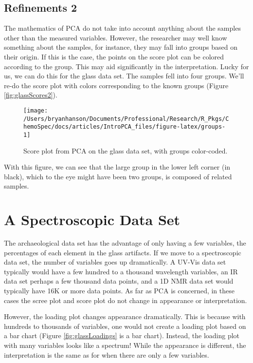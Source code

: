 \documentclass[10pt,twocolumn,twoside,]{pinp}
\begin{document}
\hypertarget{refinements-2}{%
\subsection{Refinements 2}\label{refinements-2}}

The mathematics of PCA do not take into account anything about the
samples other than the measured variables. However, the researcher may
well know something about the samples, for instance, they may fall into
groups based on their origin. If this is the case, the points on the
score plot can be colored according to the group. This may aid
significantly in the interpretation. Lucky for us, we can do this for
the glass data set. The samples fell into four groups. We'll re-do the
score plot with colors corresponding to the known groups (Figure
\ref{fig:glassScores2}).

\begin{figure}

{\centering \texttt{[image: /Users/bryanhanson/Documents/Professional/Research/R\_Pkgs/ChemoSpec/docs/articles/IntroPCA\_files/figure-latex/groups-1]} 

}

\caption{Score plot from PCA on the glass data set, with groups color-coded.\label{fig:glassScores2}}\label{fig:groups}
\end{figure}

With this figure, we can see that the large group in the lower left
corner (in black), which to the eye might have been two groups, is
composed of related samples.

\hypertarget{a-spectroscopic-data-set}{%
\section{A Spectroscopic Data Set}\label{a-spectroscopic-data-set}}

The archaeological data set has the advantage of only having a few
variables, the percentages of each element in the glass artifacts. If we
move to a spectroscopic data set, the number of variables goes up
dramatically. A UV-Vis data set typically would have a few hundred to a
thousand wavelength variables, an IR data set perhaps a few thousand
data points, and a 1D NMR data set would typically have 16K or more data
points. As far as PCA is concerned, in these cases the scree plot and
score plot do not change in appearance or interpretation.

However, the loading plot changes appearance dramatically. This is
because with hundreds to thousands of variables, one would not create a
loading plot based on a bar chart (Figure \ref{fig:glassLoadings} is a
bar chart). Instead, the loading plot with many variables looks like a
spectrum! While the appearance is different, the interpretation is the
same as for when there are only a few variables.
\end{document}
